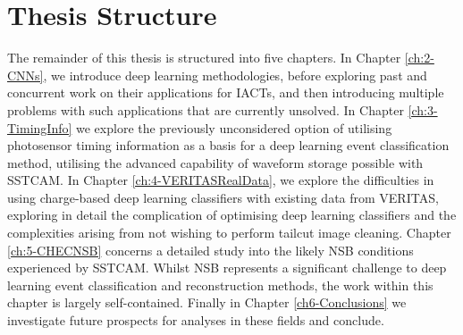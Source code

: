 \section{Thesis Structure}
The remainder of this thesis is structured into five chapters. In Chapter \ref{ch:2-CNNs}, we introduce deep learning methodologies, before exploring past and concurrent work on their applications for IACTs, and then introducing multiple problems with such applications that are currently unsolved. In Chapter \ref{ch:3-TimingInfo} we explore the previously unconsidered option of utilising photosensor timing information as a basis for a deep learning event classification method, utilising the advanced capability of waveform storage possible with SSTCAM. In Chapter \ref{ch:4-VERITASRealData}, we explore the difficulties in using charge-based deep learning classifiers with existing data from VERITAS, exploring in detail the complication of optimising deep learning classifiers and the complexities arising from not wishing to perform tailcut image cleaning. Chapter \ref{ch:5-CHECNSB} concerns a detailed study into the likely NSB conditions experienced by SSTCAM. Whilst NSB represents a significant challenge to deep learning event classification and reconstruction methods, the work within this chapter is largely self-contained. Finally in Chapter \ref{ch6-Conclusions} we investigate future prospects for analyses in these fields and conclude.